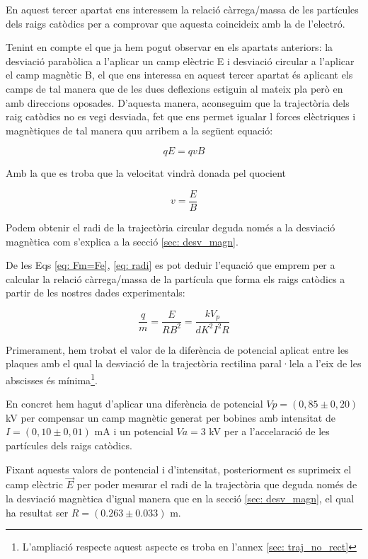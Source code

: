 \documentclass[11pt]{article}
\begin{document}
En aquest tercer apartat ens interessem la relació càrrega/massa de les partícules dels raigs catòdics per a comprovar que aquesta coincideix amb la de l'electró. 

Tenint en compte el que ja hem pogut observar en els apartats anteriors: la desviació parabòlica a l'aplicar un camp elèctric E i desviació circular a l'aplicar el camp magnètic B, el que ens interessa en aquest tercer apartat és aplicant els camps de tal manera que de les dues deflexions estiguin al mateix pla però en amb direccions oposades. D'aquesta manera, aconseguim que la trajectòria dels raig catòdics no es vegi desviada, fet que ens permet igualar l forces elèctriques i magnètiques de tal manera quu arribem a la següent equació:

\begin{equation}\label{eq: Fm=Fe}
    qE = qvB
\end{equation}

Amb la que es troba que la velocitat vindrà donada pel quocient

\begin{equation}
    v = \frac{E}{B}
\end{equation}

Podem obtenir el radi de la trajectòria circular deguda només a la desviació magnètica com s'explica a la secció \ref{sec: desv_magn}.

De les Eqs \eqref{eq: Fm=Fe}, \eqref{eq: radi} es pot deduir l'equació que emprem per a calcular la relació càrrega/massa de la partícula que forma els raigs catòdics a partir de les nostres dades experimentals:

\begin{equation}
    \frac{q}{m}=\frac{E}{RB^2}=\frac{kV_p}{dK^2I^2R}
\end{equation}

Primerament, hem trobat el valor de la diferència de potencial aplicat entre les plaques amb el qual la desviació de la trajectòria rectilina paral·lela a l'eix de les abscisses és mínima\footnote{L'ampliació respecte aquest aspecte es troba en l'annex \ref{sec: traj_no_rect}}. 

En concret hem hagut d'aplicar una diferència de potencial $Vp = (0,85 \pm 0,20 )$ kV per compensar un camp magnètic generat per bobines amb intensitat de $I = (0,10 \pm 0,01 )$ mA i un potencial $Va = 3$ kV per a l'accelaració de les partícules dels raigs catòdics.

Fixant aquests valors de pontencial i d'intensitat, posteriorment es suprimeix el camp elèctric $\vec{E}$ per poder mesurar el radi de la trajectòria que deguda només de la desviació magnètica d'igual manera que en la secció \ref{sec: desv_magn}, el qual ha resultat ser $R = (0.263 \pm 0.033)$ m.
\end{document}
